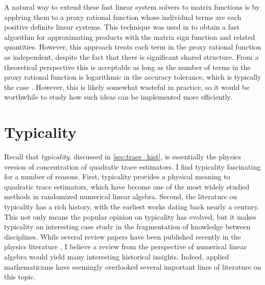 A natural way to extend these fast linear system solvers to matrix functions is by applying them to a proxy rational function whose individual terms are each positive definite linear systems.
This technique was used in \cite{jin_sidford_19} to obtain a fast algorithm for approximating products with the matrix sign function and related quantities. 
However, this approach treats each term in the proxy rational function as independent, despite the fact that there is significant shared structure.
From a theoretical perspective this is acceptable as long as the number of terms in the proxy rational function is logarithmic in the accuracy tolerance, which is typically the case \cite{gopal_trefethen_19}.
However, this is likely somewhat wasteful in practice, so it would be worthwhile to study how such ideas can be implemented more efficiently.




\section{Typicality}


Recall that \emph{typicality}, discussed in \cref{sec:trace_hist}, is essentially the physics version of concentration of quadratic trace estimators.
I find typicality fascinating for a number of reasons. 
First, typicality provides a physical meaning to quadratic trace estimators, which have become one of the most widely studied methods in randomized numerical linear algebra.
Second, the literature on typicality has a rich history, with the earliest works dating back nearly a century.
This not only means the popular opinion on typicality has evolved, but it makes typicality an interesting case study in the fragmentation of knowledge between disciplines.
While several review papers have been published recently in the physics literature \cite{goldstein_lebowitz_mastrodonato_tumulka_zanghi_10,jin_willsch_willsch_lagemann_michielsen_deraedt_21}, I believe a review from the perspective of numerical linear algebra would yield many interesting historical insights.
Indeed, applied mathematicians have seemingly overlooked several important lines of literature on this topic.

